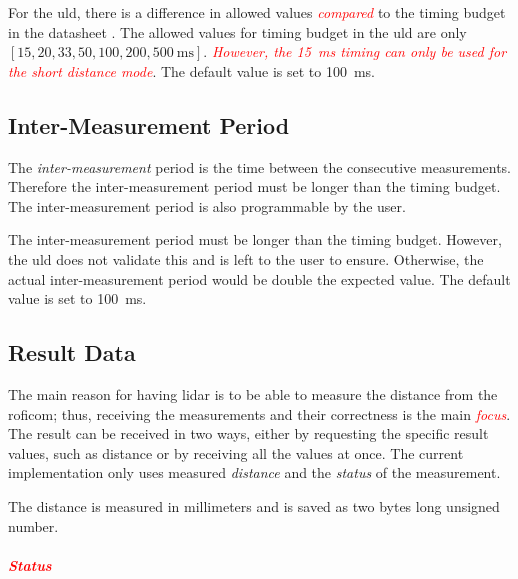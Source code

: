 \documentclass[
  digital,     %
  oneside,     %
  nosansbold,  %
  nocolorbold, %
  nolof,         %
  nolot,         %
]{fithesis4}
\newcommand{\TODO}[1]{\textcolor{red}{\textit{#1}}}
\begin{document}
{{{For the \acrshort{uld}, there is a difference in allowed values \TODO{compared} to the timing budget in the datasheet \cite{vl53l1x}. The allowed values for timing budget in the \acrshort{uld} are only $[15, 20,
33, 50, 100, 200, \qty{500}{\milli\second}]$. \TODO{However, the \qty{15}{\milli\second} timing can only be used for the short distance mode}. The default value is set to \qty{100}{\milli\second}.

\subsection{ Inter-Measurement Period }
The \emph{inter-measurement} period is the time between the consecutive measurements. Therefore the inter-measurement period must be longer than the timing budget. The inter-measurement period is also programmable by the user.

The inter-measurement period must be longer than the timing budget. However, the \acrshort{uld} does not validate this and is left to the user to ensure. Otherwise, the actual inter-measurement period would be double the expected value. The default value is set to \qty{100}{\milli\second}.

\subsection{ Result Data } \label{sec:lidar-result}

The main reason for having \acrshort{lidar} is to be able to measure the distance from the \acrshort{roficom}; thus, receiving the measurements and their correctness is the main \TODO{focus}. The result can be received in two ways, either by requesting the specific result values, such as distance or by receiving all the values at once. The current implementation only uses measured \emph{distance} and the \emph{status} of the measurement.

The distance is measured in millimeters and is saved as two bytes long unsigned number.

\paragraph{\TODO{Status}}

}}}
\end{document}
